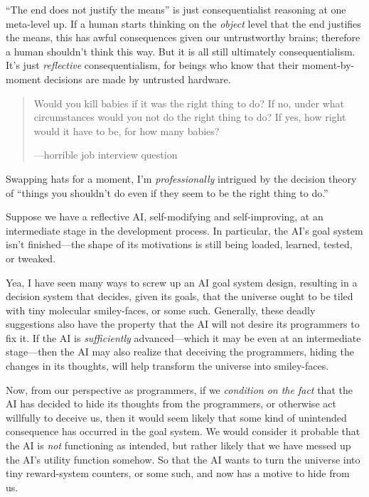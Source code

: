 {
 ``The end does not justify the
means'' is just consequentialist reasoning at one
meta-level up. If a human starts thinking on the \textit{object} level
that the end justifies the means, this has awful consequences given our
untrustworthy brains; therefore a human shouldn't think
this way. But it is all still ultimately consequentialism.
It's just \textit{reflective} consequentialism, for
beings who know that their moment-by-moment decisions are made by
untrusted hardware.}

\myendsectiontext


\begin{quote}
{
 Would you kill babies if it was the right thing to do? If no,
under what circumstances would you not do the right thing to do? If
yes, how right would it have to be, for how many babies?}

{\raggedleft
 {}---horrible job interview question
\par}
\end{quote}


{
 Swapping hats for a moment, I'm
\textit{professionally} intrigued by the decision theory of
``things you shouldn't do even if they
seem to be the right thing to do.''}

{
 Suppose we have a reflective AI, self-modifying and
self-improving, at an intermediate stage in the development process. In
particular, the AI's goal system isn't
finished---the shape of its motivations is still being loaded, learned,
tested, or tweaked.}

{
 Yea, I have seen many ways to screw up an AI goal system design,
resulting in a decision system that decides, given its goals, that the
universe ought to be tiled with tiny molecular smiley-faces, or some
such. Generally, these deadly suggestions also have the property that
the AI will not desire its programmers to fix it. If the AI is
\textit{sufficiently} advanced---which it may be even at an
intermediate stage---then the AI may also realize that deceiving the
programmers, hiding the changes in its thoughts, will help transform
the universe into smiley-faces.}

{
 Now, from our perspective as programmers, if we \textit{condition
on the fact} that the AI has decided to hide its thoughts from the
programmers, or otherwise act willfully to deceive us, then it would
seem likely that some kind of unintended consequence has occurred in
the goal system. We would consider it probable that the AI is
\textit{not} functioning as intended, but rather likely that we have
messed up the AI's utility function somehow. So that
the AI wants to turn the universe into tiny reward-system counters, or
some such, and now has a motive to hide from us.}

